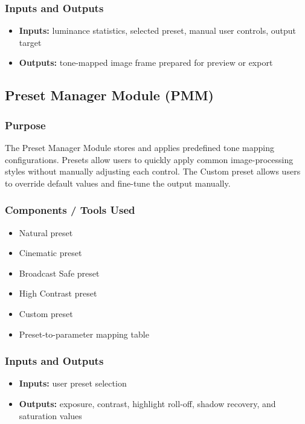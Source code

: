 \documentclass{article}
\begin{document}
\subsubsection*{Inputs and Outputs}
\begin{itemize}
    \item \textbf{Inputs:} luminance statistics, selected preset, manual user controls, output target
    \item \textbf{Outputs:} tone-mapped image frame prepared for preview or export
\end{itemize}


\subsection{Preset Manager Module (PMM)}

\subsubsection*{Purpose}
The Preset Manager Module stores and applies predefined tone mapping configurations. Presets allow users to quickly apply common image-processing styles without manually adjusting each control. The Custom preset allows users to override default values and fine-tune the output manually.

\subsubsection*{Components / Tools Used}
\begin{itemize}
    \item Natural preset
    \item Cinematic preset
    \item Broadcast Safe preset
    \item High Contrast preset
    \item Custom preset
    \item Preset-to-parameter mapping table
\end{itemize}

\subsubsection*{Inputs and Outputs}
\begin{itemize}
    \item \textbf{Inputs:} user preset selection
    \item \textbf{Outputs:} exposure, contrast, highlight roll-off, shadow recovery, and saturation values
\end{itemize}
\end{document}
